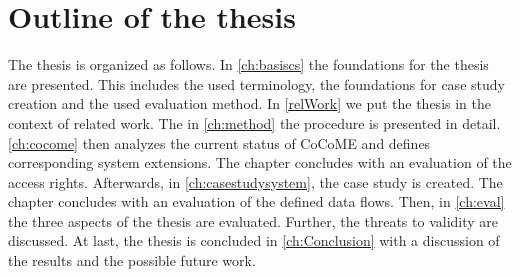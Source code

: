 \section{Outline of the thesis}
The thesis is organized as follows. In \autoref{ch:basiscs} the foundations for the thesis are presented. This includes the used terminology, the foundations for case study creation and the used evaluation method. In \autoref{relWork} we put the thesis in the context of related work. The in \autoref{ch:method} the procedure is presented in detail. \autoref{ch:cocome} then analyzes the current status of CoCoME and defines corresponding system extensions. The chapter concludes with an evaluation of the access rights. Afterwards, in \autoref{ch:casestudysystem}, the case study is created. The chapter concludes with an evaluation of the defined data flows. Then, in \autoref{ch:eval} the three aspects of the thesis are evaluated. Further, the threats to validity are discussed. At last, the thesis is concluded in \autoref{ch:Conclusion} with a discussion of the results and the possible future work.